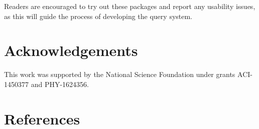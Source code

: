 \documentclass[a4paper]{jpconf}
\begin{document}
Readers are encouraged to try out these packages and report any usability issues, as this will guide the process of developing the query system.

\section*{Acknowledgements}

This work was supported by the National Science Foundation under grants ACI-1450377 and PHY-1624356.

\section*{References}



\end{document}
